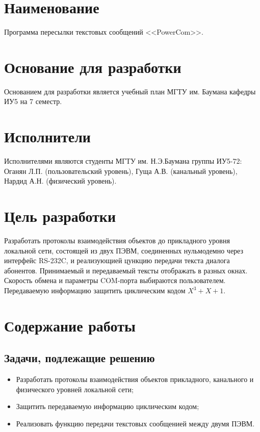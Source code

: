 \documentclass[14pt]{extarticle}
\begin{document}
\pagebreak
\thispagestyle{empty}
\tableofcontents
\clearpage

\thispagestyle{plain}
\section{Наименование}
Программа пересылки текстовых сообщений <<PowerCom>>.

\section{Основание для разработки}
Основанием для разработки является учебный план МГТУ им. Баумана кафедры ИУ5 на 7 семестр.

\section{Исполнители}
Исполнителями являются студенты МГТУ им. Н.Э.Баумана группы ИУ5-72: Оганян Л.П. (пользовательский уровень), Гуща А.В. (канальный уровень), Нардид А.Н. (физический уровень).

\section{Цель разработки}
Разработать протоколы взаимодействия объектов до прикладного уровня локальной сети, состоящей из двух ПЭВМ, соединенных нульмодемно через интерфейс RS-232C, и реализующией цункцию передачи текста диалога абонентов. Принимаемый и передаваемый тексты отображать в разных окнах. Скорость обмена и параметры COM-порта выбираются пользователем. Передаваемую информацию защитить циклическим кодом $X^3 + X + 1$.

\clearpage
\section{Содержание работы}
\subsection{Задачи, подлежащие решению}
\begin{itemize}
\item Разработать протоколы взаимодействия объектов прикладного, канального и физического уровней локальной сети;
\item Защитить передаваемую информацию циклическим кодом;
\item Реализовать функцию передачи текстовых сообщенией между двумя ПЭВМ.
\end{itemize}
\end{document}
